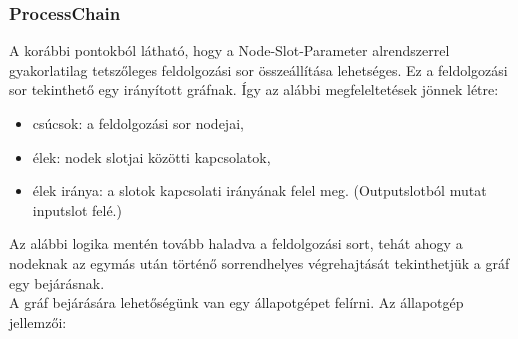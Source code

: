 \documentclass[a4paper,12pt,oneside]{report}
\begin{document}
\begin{landscape}
\begin{center}
\begin{figure}[h]
  \label{fig:bimg_dataflow}
\end{figure}
\end{center}
\end{landscape}

\subsubsection{ProcessChain}
A korábbi pontokból látható, hogy a Node-Slot-Parameter alrendszerrel gyakorlatilag tetszőleges feldolgozási sor összeállítása lehetséges. Ez a feldolgozási sor tekinthető egy irányított gráfnak. Így az alábbi megfeleltetések jönnek létre:
\begin{itemize}
	\itemsep0em
	\item csúcsok: a feldolgozási sor nodejai,
	\item élek: nodek slotjai közötti kapcsolatok,
	\item élek iránya: a slotok kapcsolati irányának felel meg. (Outputslotból mutat inputslot felé.)
\end{itemize}
Az alábbi logika mentén tovább haladva a feldolgozási sort, tehát ahogy a nodeknak az egymás után történő sorrendhelyes végrehajtását tekinthetjük a gráf egy bejárásnak.\\
A gráf bejárására lehetőségünk van egy állapotgépet felírni. Az állapotgép jellemzői:
\end{document}

